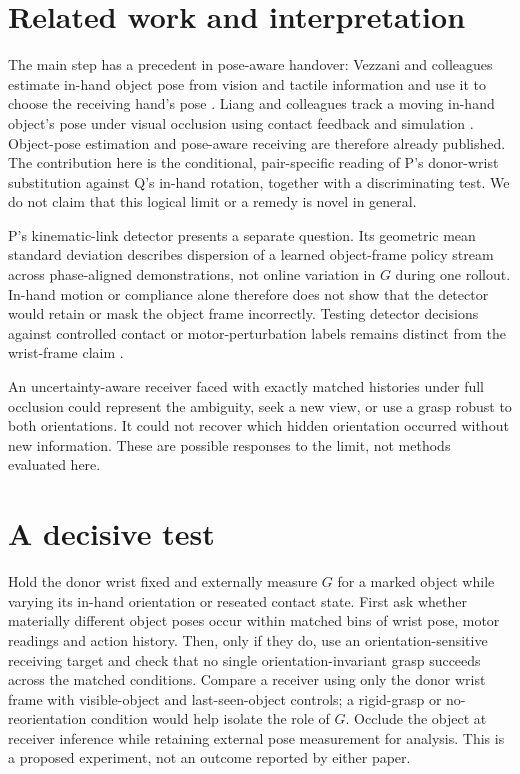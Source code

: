 \documentclass{article}
\begin{document}
\section{Related work and interpretation}

The main step has a precedent in pose-aware handover: Vezzani and colleagues estimate in-hand object pose from vision
and tactile information and use it to choose the receiving hand's pose \cite{vezzani2017}. Liang and colleagues track a
moving in-hand object's pose under visual occlusion using contact feedback and simulation \cite{liang2020}. Object-pose
estimation and pose-aware receiving are therefore already published. The contribution here is the conditional,
pair-specific reading of P's donor-wrist substitution against Q's in-hand rotation, together with a discriminating test.
We do not claim that this logical limit or a remedy is novel in general. %

P's kinematic-link detector presents a separate question. Its geometric mean standard deviation describes dispersion of
a learned object-frame policy stream across phase-aligned demonstrations, not online variation in \(G\) during one
rollout. In-hand motion or compliance alone therefore does not show that the detector would retain or mask the object
frame incorrectly. Testing detector decisions against controlled contact or motor-perturbation labels remains distinct
from the wrist-frame claim \cite{p}. %

An uncertainty-aware receiver faced with exactly matched histories under full occlusion could represent the ambiguity,
seek a new view, or use a grasp robust to both orientations. It could not recover which hidden orientation occurred
without new information. These are possible responses to the limit, not methods evaluated here. %

\section{A decisive test}

Hold the donor wrist fixed and externally measure \(G\) for a marked object while varying its in-hand orientation or
reseated contact state. First ask whether materially different object poses occur within matched bins of wrist pose,
motor readings and action history. Then, only if they do, use an orientation-sensitive receiving target and check that
no single orientation-invariant grasp succeeds across the matched conditions. Compare a receiver using only the donor
wrist frame with visible-object and last-seen-object controls; a rigid-grasp or no-reorientation condition would help
isolate the role of \(G\). Occlude the object at receiver inference while retaining external pose measurement for
analysis. This is a proposed experiment, not an outcome reported by either paper. %
\end{document}
